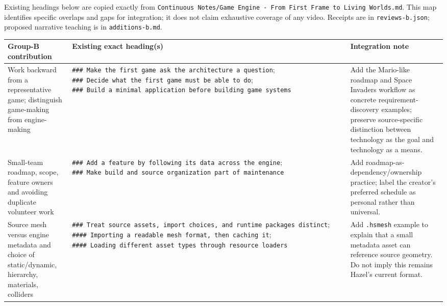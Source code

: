 Existing headings below are copied exactly from \texttt{Continuous\ Notes/Game\ Engine\ -\ From\ First\ Frame\ to\ Living\ Worlds.md}. This map identifies specific overlaps and gaps for integration; it does not claim exhaustive coverage of any video. Receipts are in \texttt{reviews-b.json}; proposed narrative teaching is in \texttt{additions-b.md}.

{\def\LTcaptype{none} %
\begin{longtable}[]{@{}
  >{\raggedright\arraybackslash}p{}
  >{\raggedright\arraybackslash}p{}
  >{\raggedright\arraybackslash}p{}@{}}
\toprule\noalign{}
\begin{minipage}[b]{\linewidth}\raggedright
Group-B contribution
\end{minipage} & \begin{minipage}[b]{\linewidth}\raggedright
Existing exact heading(s)
\end{minipage} & \begin{minipage}[b]{\linewidth}\raggedright
Integration note
\end{minipage} \\
\midrule\noalign{}
\endhead
\bottomrule\noalign{}
\endlastfoot
Work backward from a representative game; distinguish game-making from engine-making & \texttt{\#\#\#\ Make\ the\ first\ game\ ask\ the\ architecture\ a\ question}; \texttt{\#\#\#\ Decide\ what\ the\ first\ game\ must\ be\ able\ to\ do}; \texttt{\#\#\#\ Build\ a\ minimal\ application\ before\ building\ game\ systems} & Add the Mario-like roadmap and Space Invaders workflow as concrete requirement-discovery examples; preserve source-specific distinction between technology as the goal and technology as a means. \\
Small-team roadmap, scope, feature owners and avoiding duplicate volunteer work & \texttt{\#\#\#\ Add\ a\ feature\ by\ following\ its\ data\ across\ the\ engine}; \texttt{\#\#\#\ Make\ build\ and\ source\ organization\ part\ of\ maintenance} & Add roadmap-as-dependency/ownership practice; label the creator's preferred schedule as personal rather than universal. \\
Source mesh versus engine metadata and choice of static/dynamic, hierarchy, materials, colliders & \texttt{\#\#\#\ Treat\ source\ assets,\ import\ choices,\ and\ runtime\ packages\ distinct}; \texttt{\#\#\#\#\ Importing\ a\ readable\ mesh\ format,\ then\ caching\ it}; \texttt{\#\#\#\#\ Loading\ different\ asset\ types\ through\ resource\ loaders} & Add \texttt{.hsmesh} example to explain that a small metadata asset can reference source geometry. Do not imply this remains Hazel's current format. \\

\end{longtable}}
